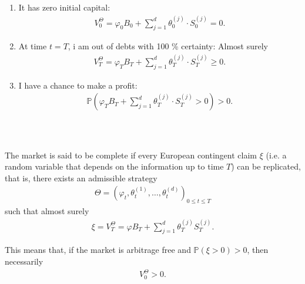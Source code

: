 \documentclass{beamer}
\numberwithin{equation}{section}
\begin{document}
\begin{frame}\frametitle{{\normalsize \secname} \\ {\large \subsecname}}
    \begin{enumerate}
        \item It has zero initial capital:
        \begin{align}
            V_0^\Theta = \varphi_0B_0 + \sum_{j = 1}^d\theta_0^{(j)} \cdot S_0^{(j)} = 0.
        \end{align}
        \item At time $t = T$, i am out of debts with 100 \% certainty: Almost surely
        \begin{align}
            V_T^\Theta = \varphi_T B_T + \sum_{j = 1}^d\theta_T^{(j)} \cdot S_T^{(j)} \geq 0.
        \end{align}
        \item I have a chance to make a profit:
        \begin{align}
            \mathbb{P}
            \left(
                \varphi_TB_T + \sum_{j = 1}^d \theta_T^{(j)} \cdot S_T^{(j)} > 0
            \right) > 0.
        \end{align}
    \end{enumerate}
\end{frame}

\begin{frame}\frametitle{{\normalsize \secname} \\ {\large \subsecname}}
    \begingroup
    \small
    \begin{definition}
        The market is said to be complete if every European contingent claim $\xi$ (i.e. a random variable that depends on the information up to time $T$) can be replicated, that is, there exists an admissible strategy
        \begin{align}
            \Theta = \left(\varphi_t, \theta_t^{(1)}, \ldots, \theta_t^{(d)}\right)_{0 \leq t \leq T}
        \end{align}
        such that almost surely
        \begin{align}
            \xi = V_T^{\Theta} = \varphi B_T + \sum_{j = 1}^d \theta_T^{(j)}S_T^{(j)}.
        \end{align}
    \end{definition}
    \endgroup
    \begingroup
    \footnotesize
    This means that, if the market is arbitrage free and $\mathbb{P}\left(\xi > 0\right) > 0$, then necessarily
    \begin{align}
        V_0^\Theta > 0.
    \end{align}
    \endgroup
\end{frame}
\end{document}
